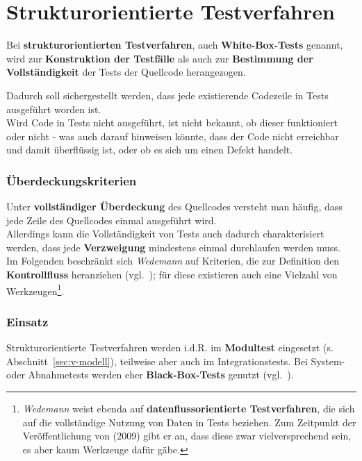 \section{Strukturorientierte Testverfahren}\label{sec:strukturorientierte-testverfahren}
\begin{tcolorbox}
Bei \textbf{strukturorientierten Testverfahren}, auch \textbf{White-Box-Tests} genannt, wird zur \textbf{Konstruktion der Testfälle} als auch zur \textbf{Bestimmung der Vollständigkeit} der Tests der Quellcode herangezogen.
\end{tcolorbox}

\noindent
Dadurch soll sichergestellt werden, dass jede existierende Codezeile in Tests ausgeführt worden ist.\\
Wird Code in Tests nicht ausgeführt, ist nicht bekannt, ob dieser funktioniert oder nicht - was auch darauf hinweisen könnte, dass der Code nicht erreichbar und damit überflüssig ist, oder ob es sich um einen Defekt handelt.

\subsubsection*{Überdeckungskriterien}
Unter \textbf{vollständiger Überdeckung} des Quellcodes versteht man häufig, dass jede Zeile des Quellcodes einmal ausgeführt wird.\\
Allerdings kann die Vollständigkeit von Tests auch dadurch charakterisiert werden, dass jede \textbf{Verzweigung} mindestens einmal durchlaufen werden muss.\\
Im Folgenden beschränkt sich \textit{Wedemann} auf Kriterien, die zur Definition den \textbf{Kontrollfluss} heranziehen (vgl.~\cite[49 f.]{Wed09c}); für diese existieren auch eine Vielzahl von Werkzeugen\footnote{
\textit{Wedemann} weist ebenda auf \textbf{datenflussorientierte Testverfahren}, die sich auf die vollständige Nutzung von Daten in Tests beziehen. Zum Zeitpunkt der Veröffentlichung von \cite{Wed09c} (2009) gibt er an, dass diese zwar vielversprechend sein, es aber kaum Werkzeuge dafür gäbe.
}.

\subsubsection*{Einsatz}
Strukturorientierte Testverfahren werden i.d.R. im \textbf{Modultest} eingesetzt (s. Abschnitt~\ref{sec:v-modell}), teilweise aber auch im Integrationstests.
Bei System- oder Abnahmetests werden eher \textbf{Black-Box-Tests} genutzt (vgl.~\cite[50]{Wed09c}).

